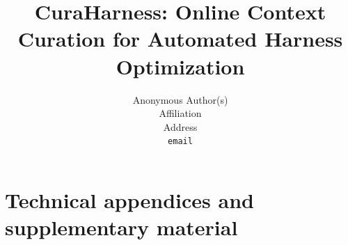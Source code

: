 \documentclass{article}
\title{CuraHarness: Online Context Curation for Automated Harness Optimization}
\author{%
  Anonymous Author(s) \\
  Affiliation \\
  Address \\
  \texttt{email} \\
}
\begin{document}
\maketitle

\begin{abstract}

\end{abstract}









% 













\appendix

\section{Technical appendices and supplementary material}




\newpage

\end{document}
